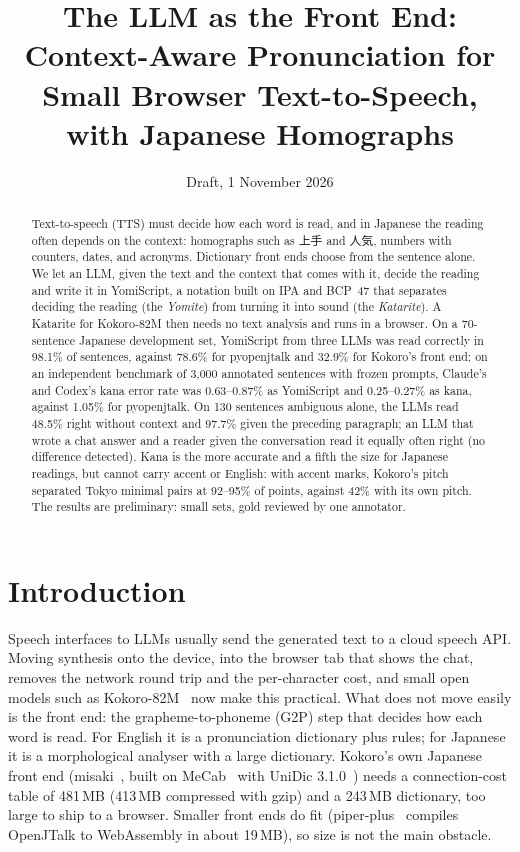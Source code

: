 \documentclass[11pt,a4paper]{article}
\title{The LLM as the Front End:\\
Context-Aware Pronunciation for Small Browser Text-to-Speech, with Japanese Homographs}
\author{\todo{authors and affiliations}}
\date{Draft, 1 November 2026}
\begin{document}
\maketitle

\begin{abstract}
Text-to-speech (TTS) must decide how each word is read, and in Japanese the reading often depends on the context:
homographs such as 上手 and 人気, numbers with counters, dates, and acronyms. Dictionary front ends choose from the
sentence alone. We let an LLM, given the text and the context that comes with it, decide the reading and write it in
YomiScript, a notation built on IPA and BCP~47 that separates deciding the reading (the \emph{Yomite}) from turning it
into sound (the \emph{Katarite}). A Katarite for Kokoro-82M then needs no text analysis and runs in a browser. On a
70-sentence Japanese development set, YomiScript from three LLMs was read correctly in 98.1\% of sentences, against
78.6\% for pyopenjtalk and 32.9\% for Kokoro's front end; on an independent benchmark of 3{,}000 annotated sentences
with frozen prompts, Claude's and Codex's kana error rate was 0.63--0.87\% as YomiScript and 0.25--0.27\% as kana,
against 1.05\% for pyopenjtalk. On 130 sentences ambiguous alone, the LLMs read 48.5\% right
without context and 97.7\% given the preceding paragraph; an LLM that wrote a chat answer and a reader
given the conversation read it equally often right (no difference detected). Kana is the more accurate and a fifth
the size for Japanese readings, but
cannot carry accent or English: with accent marks, Kokoro's pitch separated Tokyo minimal pairs at 92--95\% of points,
against 42\% with its own pitch. The results are preliminary: small sets, gold reviewed by one annotator.
\end{abstract}

\section{Introduction}

Speech interfaces to LLMs usually send the generated text to a cloud speech API. Moving synthesis onto the device,
into the browser tab that shows the chat, removes the network round trip and the per-character cost, and small
open models such as Kokoro-82M~\citep{kokoro82m} now make this practical. What does not move easily is the front end:
the grapheme-to-phoneme (G2P) step that decides how each word is read. For English it is a pronunciation dictionary
plus rules; for Japanese it is a morphological analyser with a large dictionary. Kokoro's own Japanese front end
(misaki~\citep{misaki}, built on MeCab~\citep{kudo2004mecab} with UniDic 3.1.0~\citep{den2008unidic}) needs a
connection-cost table of 481\,MB (413\,MB compressed with gzip) and a 243\,MB dictionary, too large to ship to a
browser. Smaller front ends do fit (piper-plus~\citep{piperplus} compiles OpenJTalk to WebAssembly in about 19\,MB), so
size is not the main obstacle.
\end{document}
